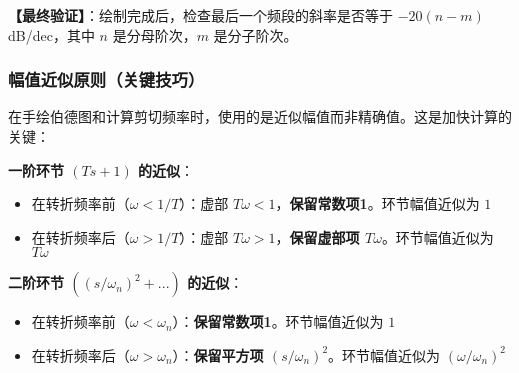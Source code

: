 \textbf{【最终验证】}：绘制完成后，检查最后一个频段的斜率是否等于 $-20(n-m)$ dB/dec，其中 $n$ 是分母阶次，$m$ 是分子阶次。

\subsubsection{幅值近似原则（关键技巧）}

在手绘伯德图和计算剪切频率时，使用的是近似幅值而非精确值。这是加快计算的关键：

\textbf{一阶环节 $(Ts+1)$ 的近似}：
\begin{itemize}
    \item 在转折频率前（$\omega < 1/T$）：虚部 $T\omega < 1$，\textbf{保留常数项1}。环节幅值近似为 $1$
    \item 在转折频率后（$\omega > 1/T$）：虚部 $T\omega > 1$，\textbf{保留虚部项 $T\omega$}。环节幅值近似为 $T\omega$
\end{itemize}

\textbf{二阶环节 $((s/\omega_n)^2 + ...)$ 的近似}：
\begin{itemize}
    \item 在转折频率前（$\omega < \omega_n$）：\textbf{保留常数项1}。环节幅值近似为 $1$
    \item 在转折频率后（$\omega > \omega_n$）：\textbf{保留平方项 $(s/\omega_n)^2$}。环节幅值近似为 $(\omega/\omega_n)^2$
\end{itemize}

